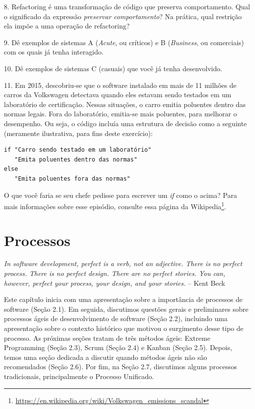 \documentclass[
  11pt,
  twoside]{book}
\DeclareRobustCommand{\href}[2]{#2\footnote{\url{#1}}}
\renewenvironment{quote}{\centering \vspace{1.5ex} \begin{tcolorbox}[colback=backcolor, width=4.9in]}{\end{tcolorbox}}
\begin{document}
8. Refactoring é uma transformação de código que preserva comportamento.
Qual o significado da expressão \emph{preservar comportamento}? Na
prática, qual restrição ela impõe a uma operação de refactoring?

9. Dê exemplos de sistemas A (\emph{Acute}, ou críticos) e B
(\emph{Business}, ou comerciais) com os quais já tenha interagido.

10. Dê exemplos de sistemas C (casuais) que você já tenha desenvolvido.

 11. Em 2015, descobriu-se que o software
instalado em mais de 11 milhões de carros da Volkswagen detectava quando
eles estavam sendo testados em um laboratório de certificação. Nessas
situações, o carro emitia poluentes dentro das normas legais. Fora do
laboratório, emitia-se mais poluentes, para melhorar o desempenho. Ou
seja, o código incluía uma estrutura de decisão como a seguinte
(meramente ilustrativa, para fins deste exercício):

\begin{lstlisting}
if "Carro sendo testado em um laboratório"
   "Emita poluentes dentro das normas"
else 
   "Emita poluentes fora das normas"
\end{lstlisting}

O que você faria se seu chefe pedisse para escrever um \emph{if} como o
acima? Para mais informações sobre esse episódio, consulte essa página
da
\href{https://en.wikipedia.org/wiki/Volkswagen_emissions_scandal}{Wikipedia}.

\hypertarget{processos}{%
\chapter{Processos}\label{processos}}

\begin{quote}
\emph{In software development, perfect is a verb, not an adjective.
There is no perfect process. There is no perfect design. There are no
perfect stories. You can, however, perfect your process, your design,
and your stories.} -- Kent Beck
\end{quote}

 Este capítulo inicia com uma apresentação
sobre a importância de processos de software (Seção 2.1). Em seguida,
discutimos questões gerais e preliminares sobre processos ágeis de
desenvolvimento de software (Seção 2.2), incluindo uma apresentação
sobre o contexto histórico que motivou o surgimento desse tipo de
processo. As próximas seções tratam de três métodos ágeis: Extreme
Programming (Seção 2.3), Scrum (Seção 2.4) e Kanban (Seção 2.5). Depois,
temos uma seção dedicada a discutir quando métodos ágeis não são
recomendados (Seção 2.6). Por fim, na Seção 2.7, discutimos alguns
processos tradicionais, principalmente o Processo Unificado.
\end{document}
